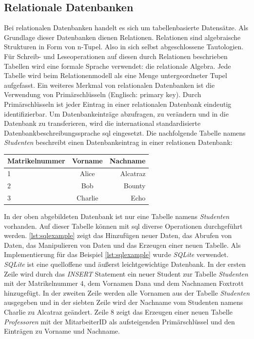 \documentclass[titlepage]{report}
\begin{document}
\subsection{Relationale Datenbanken}
Bei relationalen Datenbanken handelt es sich um tabellenbasierte Datensätze.
Als Grundlage dieser Datenbanken dienen Relationen. Relationen sind
algebraische Strukturen in Form von n\hyp{}Tupel. Also in sich selbst
abgeschlossene Tautologien. Für Schreib\hyp{} und Leseoperationen auf
diesen durch Relationen beschrieben Tabellen wird eine
formale Sprache verwendet: die relationale Algebra. Jede Tabelle wird beim
Relationenmodell als eine Menge untergeordneter Tupel aufgefasst\cite[S.
4]{MEIER2013}. Ein weiteres Merkmal von relationalen Datenbanken ist die
Verwendung von Primärschlüsseln (Englisch: primary key). Durch Primärschlüsseln
ist jeder Eintrag in einer relationalen Datenbank eindeutig identifizierbar. Um
Datenbankeinträge abzufragen, zu verändern und in die Datenbank zu
transferieren, wird die international standardisierte
Datenbankbeschreibungssprache \gls{sql} eingesetzt. Die nachfolgende Tabelle
namens \emph{Studenten} beschreibt einen Datenbankeintrag in einer relationen
Datenbank:
\begin{center}
    \begin{tabular}{l c r}
        \toprule
        Matrikelnummer & Vorname & Nachname \\
        \midrule
        1              & Alice   & Alcatraz \\
        2              & Bob     & Bounty   \\
        3              & Charlie & Echo     \\
        \bottomrule
    \end{tabular}
\end{center}
In der oben abgebildeten Datenbank ist nur eine Tabelle namens
\emph{Studenten} vorhanden. Auf dieser Tabelle können mit \gls{sql} diverse
Operationen durchgeführt werden. \autoref{lst:sqlexample} zeigt das Hinzufügen neuer
Daten, das Abrufen von Daten, das Manipulieren von Daten und das
Erzeugen einer neuen Tabelle. Als Implementierung für das Beispiel
\autoref{lst:sqlexample} wurde \emph{SQLite}
verwendet. \emph{SQLite} ist eine quelloffene und äußerst
leichtgewichtige Datenbank\cite{SQLITE}. In der ersten Zeile wird durch das \emph{INSERT} Statement
ein neuer Student zur Tabelle \emph{Studenten} mit der Matrikelnummer 4,
dem Vornamen Dana und dem Nachnamen Foxtrott hinzugefügt. In der zweiten
Zeile werden alle Vornamen aus der Tabelle \emph{Studenten}
ausgegeben und in der siebten Zeile wird der Nachname vom Studenten
namens Charlie zu Alcatraz geändert. Zeile 8 zeigt das Erzeugen einer
neuen Tabelle \emph{Professoren} mit der MitarbeiterID als
aufsteigenden Primärschlüssel und den Einträgen zu Vorname und Nachname.
\end{document}

